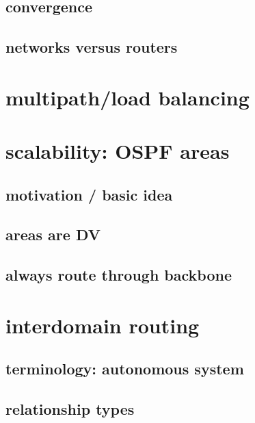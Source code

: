 \subsection{convergence}


\subsection{networks versus routers}
 

\section{multipath/load balancing}


\section{scalability: OSPF areas} %

\subsection{motivation / basic idea}



\subsection{areas are DV}



\subsection{always route through backbone}


\section{interdomain routing}


\subsection{terminology: autonomous system}


\subsection{relationship types}


